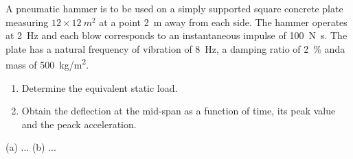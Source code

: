 
\begin{Exercise}[label=pneumatic_hammer]
A pneumatic hammer is to be used on a simply supported square concrete plate measuring $12\times\SI{12}{m^2}$ at a point \SI{2}{m} away from each side. The hammer operates at \SI{2}{Hz} and each blow corresponds to an instantaneous impulse of \SI{100}{N.s}. The plate has a natural frequency of vibration of \SI{8}{Hz}, a damping ratio of \SI{2}{\%} anda mass of \SI{500}{kg/m^2}.
\begin{enumerate}
    \item Determine the equivalent static load.
    \item Obtain the deflection at the mid-span as a function of time, its peak value and the peack acceleration.
\end{enumerate}

\shortAnswer (a) ... (b) ...
\end{Exercise}


\begin{Answer}[ref=pneumatic_hammer]
    
\end{Answer}
